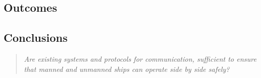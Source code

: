\subsection{Outcomes}

\subsection{Conclusions}

\begin{quotation}
	\emph{Are existing systems and protocols for communication, sufficient to ensure that manned and unmanned ships can operate side by side safely?}
\end{quotation}